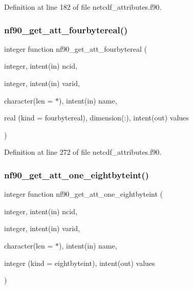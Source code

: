 Definition at line 182 of file netcdf\+\_\+attributes.\+f90.

\mbox{\label{netcdf__attributes_8f90_a1f0e09b16f01e6e4b9deacba403bac61}} 
\subsubsection{\texorpdfstring{nf90\+\_\+get\+\_\+att\+\_\+fourbytereal()}{nf90\_get\_att\_fourbytereal()}}
{\footnotesize\ttfamily integer function nf90\+\_\+get\+\_\+att\+\_\+fourbytereal (\begin{DoxyParamCaption}\item[{integer, intent(in)}]{ncid,  }\item[{integer, intent(in)}]{varid,  }\item[{character(len = $\ast$), intent(in)}]{name,  }\item[{real (kind = fourbytereal), dimension(\+:), intent(out)}]{values }\end{DoxyParamCaption})}



Definition at line 272 of file netcdf\+\_\+attributes.\+f90.

\mbox{\label{netcdf__attributes_8f90_aa177a6c54e32eb56f8bee42bb9913d16}} 
\subsubsection{\texorpdfstring{nf90\+\_\+get\+\_\+att\+\_\+one\+\_\+eightbyteint()}{nf90\_get\_att\_one\_eightbyteint()}}
{\footnotesize\ttfamily integer function nf90\+\_\+get\+\_\+att\+\_\+one\+\_\+eightbyteint (\begin{DoxyParamCaption}\item[{integer, intent(in)}]{ncid,  }\item[{integer, intent(in)}]{varid,  }\item[{character(len = $\ast$), intent(in)}]{name,  }\item[{integer (kind = eightbyteint), intent(out)}]{values }\end{DoxyParamCaption})}



